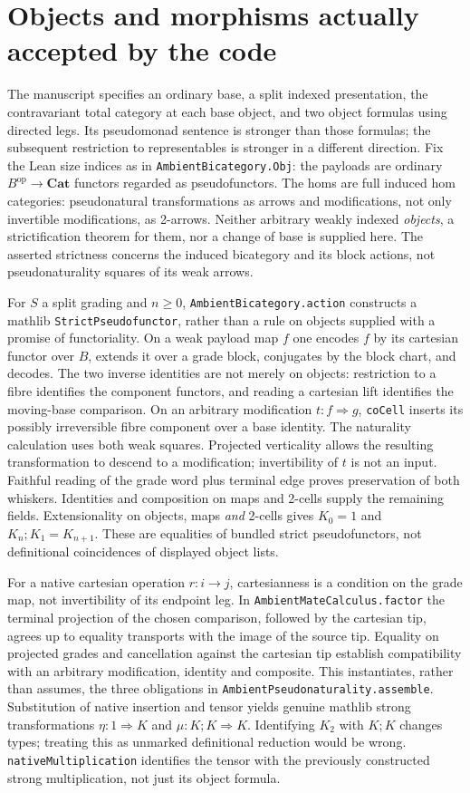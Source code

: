 \documentclass[11pt]{article}
\newcommand{\code}{\nolinkurl}
\begin{document}
\section{Objects and morphisms actually accepted by the code}
The manuscript specifies an ordinary base, a split indexed presentation, the contravariant total category at each base object, and two object formulas using directed legs. Its pseudomonad sentence is stronger than those formulas; the subsequent restriction to representables is stronger in a different direction. Fix the Lean size indices as in \code{AmbientBicategory.Obj}: the payloads are ordinary $B^{\mathrm{op}}\to\mathbf{Cat}$ functors regarded as pseudofunctors. The homs are full induced hom categories: pseudonatural transformations as arrows and modifications, not only invertible modifications, as 2-arrows. Neither arbitrary weakly indexed \emph{objects}, a strictification theorem for them, nor a change of base is supplied here. The asserted strictness concerns the induced bicategory and its block actions, not pseudonaturality squares of its weak arrows.
   
For $S$ a split grading and $n\ge0$, \code{AmbientBicategory.action} constructs a mathlib \code{StrictPseudofunctor}, rather than a rule on objects supplied with a promise of functoriality. On a weak payload map $f$ one encodes $f$ by its cartesian functor over $B$, extends it over a grade block, conjugates by the block chart, and decodes. The two inverse identities are not merely on objects: restriction to a fibre identifies the component functors, and reading a cartesian lift identifies the moving-base comparison. On an arbitrary modification $t:f\Rightarrow g$, \code{coCell} inserts its possibly irreversible fibre component over a base identity. The naturality calculation uses both weak squares. Projected verticality allows the resulting transformation to descend to a modification; invertibility of $t$ is not an input. Faithful reading of the grade word plus terminal edge proves preservation of both whiskers. Identities and composition on maps and 2-cells supply the remaining fields. Extensionality on objects, maps \emph{and} 2-cells gives $K_0=1$ and $K_n;K_1=K_{n+1}$. These are equalities of bundled strict pseudofunctors, not definitional coincidences of displayed object lists.

For a native cartesian operation $r:i\to j$, cartesianness is a condition on the grade map, not invertibility of its endpoint leg. In \code{AmbientMateCalculus.factor} the terminal projection of the chosen comparison, followed by the cartesian tip, agrees up to equality transports with the image of the source tip. Equality on projected grades and cancellation against the cartesian tip establish compatibility with an arbitrary modification, identity and composite. This instantiates, rather than assumes, the three obligations in \code{AmbientPseudonaturality.assemble}. Substitution of native insertion and tensor yields genuine mathlib strong transformations $\eta:1\Rightarrow K$ and $\mu:K;K\Rightarrow K$. Identifying $K_2$ with $K;K$ changes types; treating this as unmarked definitional reduction would be wrong. \code{nativeMultiplication} identifies the tensor with the previously constructed strong multiplication, not just its object formula.
\end{document}
